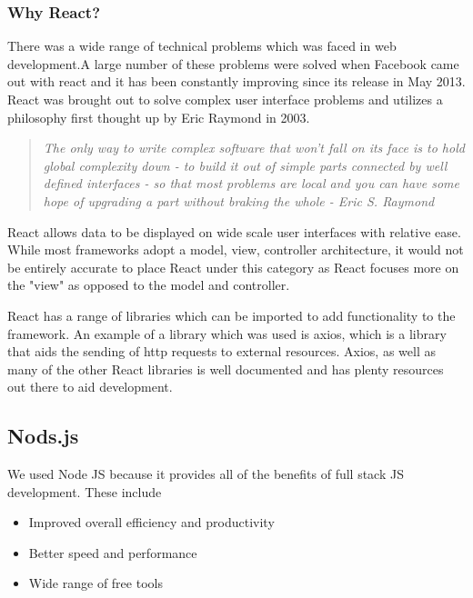 \subsubsection{Why React?}
There was a wide range of technical problems which was faced in web development.A large number of these problems were solved when Facebook came out with react and it has been constantly improving since its release in May 2013. \cite{IntroductionReact}React was brought out to solve complex user interface problems and utilizes a philosophy first thought up by Eric Raymond in 2003.

\begin{quote}
\emph{The only way to write complex software that won't fall on its face is to hold global complexity down - to build it out of simple parts connected by well defined interfaces - so that most problems are local and you can have some hope of upgrading a part without braking the whole - Eric S. Raymond} \cite{ArtOfUnix}
\end{quote}

\cite{IntroductionReact}React allows data to be displayed on wide scale user interfaces with relative ease. While most frameworks adopt a model, view, controller architecture, it would not be entirely accurate to place React under this category as React focuses more on the "view" as opposed to the model and controller. \par
React has a range of libraries which can be imported to add functionality to the framework. An example of a library which was used is axios, which is a library that aids the sending of http requests to external resources. \cite{Axios}Axios, as well as many of the other React libraries is well documented and has plenty resources out there to aid development.

\subsection{Nods.js}
We used Node JS because it provides all of the benefits of \cite{fullStackJS}full stack JS development. These include

\begin{itemize}
    \item Improved overall efficiency and productivity
    \item Better speed and performance
    \item Wide range of free tools
\end{itemize}

